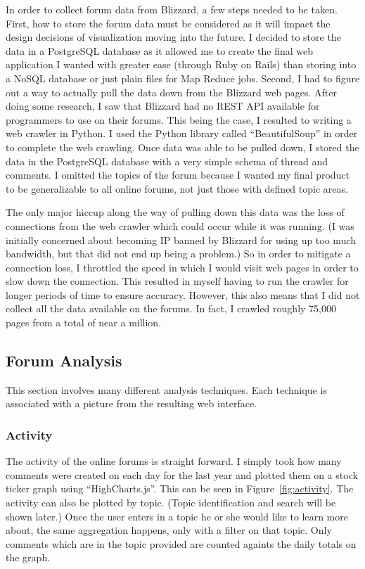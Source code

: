 \documentclass[conference]{IEEEtran}
\begin{document}
In order to collect forum data from Blizzard, a few steps needed to be taken. First, how to store the forum
data must be considered as it will impact the design decisions of visualization moving into the future. I decided
to store the data in a PostgreSQL database as it allowed me to create the final web application I wanted with
greater ease (through Ruby on Rails) than storing into a NoSQL database or just plain files for Map Reduce jobs.
Second, I had to figure out a way to actually pull the data down from the Blizzard web pages. After doing some
research, I saw that Blizzard had no REST API available for programmers to use on their forums. This being
the case, I resulted to writing a web crawler in Python. I used the Python library called ``BeautifulSoup'' in
order to complete the web crawling. Once data was able to be pulled down, I stored the data in the PostgreSQL 
database with a very simple schema of thread and comments. I omitted the topics of the forum because I wanted
my final product to be generalizable to all online forums, not just those with defined topic areas.

The only major hiccup along the way of pulling down this data was the loss of connections from the web crawler
which could occur while it was running. (I was initially concerned about becoming IP banned by Blizzard for
using up too much bandwidth, but that did not end up being a problem.) So in order to mitigate a connection loss,
I throttled the speed in which I would visit web pages in order to slow down the connection. This resulted in
myself having to run the crawler for longer periods of time to ensure accuracy. However, this also means that
I did not collect all the data available on the forums. In fact, I crawled roughly 75,000 pages from a total
of near a million.

\subsection{Forum Analysis}

This section involves many different analysis techniques. Each technique is associated with a picture from
the resulting web interface.

\subsubsection{Activity}

The activity of the online forums is straight forward. I simply took how many comments were created on each
day for the last year and plotted them on a stock ticker graph using ``HighCharts.js''. This can be seen in
Figure~\ref{fig:activity}. The activity can also be plotted by topic. (Topic identification and search will
be shown later.) Once the user enters in a topic he or she would like to learn more about, the same aggregation
happens, only with a filter on that topic. Only comments which are in the topic provided are counted againts
the daily totals on the graph.
\end{document}

